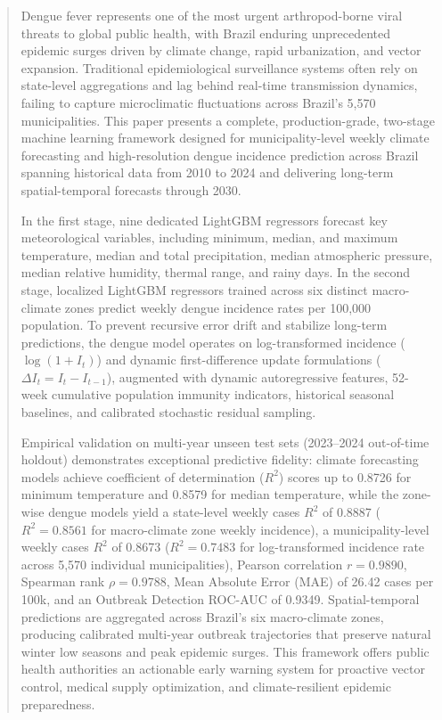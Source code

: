 \documentclass[journal,onecolumn,11pt]{IEEEtran}
\begin{document}
\begin{abstract}
Dengue fever represents one of the most urgent arthropod-borne viral threats to global public health, with Brazil enduring unprecedented epidemic surges driven by climate change, rapid urbanization, and vector expansion. Traditional epidemiological surveillance systems often rely on state-level aggregations and lag behind real-time transmission dynamics, failing to capture microclimatic fluctuations across Brazil's 5,570 municipalities. This paper presents a complete, production-grade, two-stage machine learning framework designed for municipality-level weekly climate forecasting and high-resolution dengue incidence prediction across Brazil spanning historical data from 2010 to 2024 and delivering long-term spatial-temporal forecasts through 2030. 

In the first stage, nine dedicated LightGBM regressors forecast key meteorological variables, including minimum, median, and maximum temperature, median and total precipitation, median atmospheric pressure, median relative humidity, thermal range, and rainy days. In the second stage, localized LightGBM regressors trained across six distinct macro-climate zones predict weekly dengue incidence rates per 100,000 population. To prevent recursive error drift and stabilize long-term predictions, the dengue model operates on log-transformed incidence ($\log(1 + I_t)$) and dynamic first-difference update formulations ($\Delta I_t = I_t - I_{t-1}$), augmented with dynamic autoregressive features, 52-week cumulative population immunity indicators, historical seasonal baselines, and calibrated stochastic residual sampling. 

Empirical validation on multi-year unseen test sets (2023--2024 out-of-time holdout) demonstrates exceptional predictive fidelity: climate forecasting models achieve coefficient of determination ($R^2$) scores up to 0.8726 for minimum temperature and 0.8579 for median temperature, while the zone-wise dengue models yield a state-level weekly cases $R^2$ of 0.8887 ($R^2 = 0.8561$ for macro-climate zone weekly incidence), a municipality-level weekly cases $R^2$ of 0.8673 ($R^2 = 0.7483$ for log-transformed incidence rate across 5,570 individual municipalities), Pearson correlation $r = 0.9890$, Spearman rank $\rho = 0.9788$, Mean Absolute Error (MAE) of 26.42 cases per 100k, and an Outbreak Detection ROC-AUC of 0.9349. Spatial-temporal predictions are aggregated across Brazil's six macro-climate zones, producing calibrated multi-year outbreak trajectories that preserve natural winter low seasons and peak epidemic surges. This framework offers public health authorities an actionable early warning system for proactive vector control, medical supply optimization, and climate-resilient epidemic preparedness.
\end{abstract}
\end{document}
